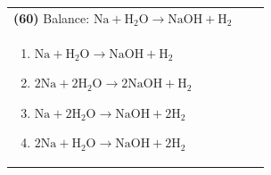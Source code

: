 \documentclass{article}
\begin{document}
\vspace{0.2cm}
\noindent \begin{tabular}{|p{0.9\linewidth}|}
\hline
\vspace{0.2cm}
\textbf{(60)} Balance: $\mathrm{Na + H_2O \rightarrow NaOH + H_2}$\\
\begin{minipage}[t]{0.85\linewidth}
\begin{enumerate}[label=\alph*.]
\item $\mathrm{Na + H_2O \rightarrow NaOH + H_2}$
\item $\mathrm{2Na + 2H_2O \rightarrow 2NaOH + H_2}$
\item $\mathrm{Na + 2H_2O \rightarrow NaOH + 2H_2}$
\item $\mathrm{2Na + H_2O \rightarrow NaOH + 2H_2}$
\end{enumerate}
\end{minipage}\\
\hline
\end{tabular}
\end{document}
